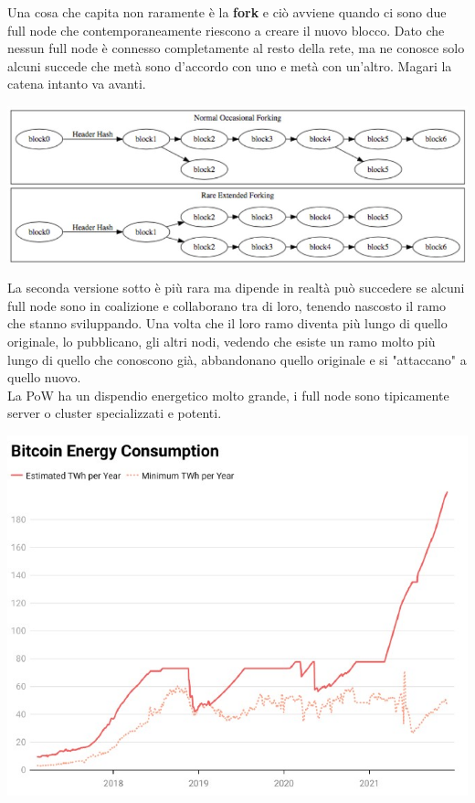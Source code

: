 Una cosa che capita non raramente è la \textbf{fork} e ciò avviene quando ci sono due full node che contemporaneamente riescono a creare il nuovo blocco. Dato che nessun full node è connesso completamente al resto della rete, ma ne conosce solo alcuni succede che metà sono d'accordo con uno e metà con un'altro. Magari la catena intanto va avanti. 

\begin{center}
    \includegraphics[scale=0.4]{Images/Blockchain/ProofOfWork.jpg}
\end{center}

La seconda versione sotto è più rara ma dipende in realtà può succedere se alcuni full node sono in coalizione e collaborano tra di loro, tenendo nascosto il ramo che stanno sviluppando. Una volta che il loro ramo diventa più lungo di quello originale, lo pubblicano, gli altri nodi, vedendo che esiste un ramo molto più lungo di quello che conoscono già, abbandonano quello originale e si "attaccano" a quello nuovo. \\

La PoW ha un dispendio energetico molto grande, i full node sono tipicamente server o cluster specializzati e potenti.

\begin{center}
    \includegraphics[scale=0.4]{Images/Blockchain/BitcoinEnergyConsumption.jpg}
\end{center}


